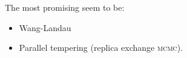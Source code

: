 \documentclass[../notebook.tex]{subfiles}
\begin{document}

The most promising seem to be:

\begin{itemize}
  \item Wang-Landau
  \item Parallel tempering (replica exchange \textsc{mcmc}).
\end{itemize}







\end{document}
